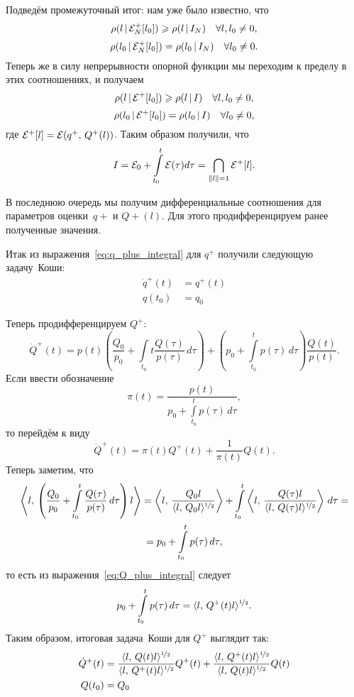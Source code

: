 Подведём промежуточный итог: нам уже было известно, что 
$$
        \rho(l\,|\,\mathcal{E}^+_N[l_0]) \geqslant \rho(l\,|\,I_N)
        \quad
        \forall l, l_0 \neq 0,
$$
$$
        \rho(l_0\,|\,\mathcal{E}^+_N[l_0]) = \rho(l_0\,|\,I_N)
        \quad
        \forall l_0 \neq 0.
$$
Теперь же в силу непрерывности опорной функции мы переходим к пределу в этих соотношениях, и получаем
$$
        \rho(l\,|\,\mathcal{E}^+[l_0]) \geqslant \rho(l\,|\,I)
        \quad
        \forall l, l_0 \neq 0,
$$
$$
        \rho(l_0\,|\,\mathcal{E}^+[l_0]) = \rho(l_0\,|\,I)
        \quad
        \forall l_0 \neq 0,
$$
где $\mathcal{E}^+[l] = \mathcal{E}(q^+,\,Q^+(l))$.
Таким образом получили, что
$$
        I
        =
        \mathcal{E}_0 + \int\limits_{t_0}^t \mathcal{E}(\tau)d\tau
        =
        \bigcap\limits_{\| l \| = 1} \mathcal{E}^+[l].
$$

В последнюю очередь мы получим дифференциальные соотношения для параметров оценки~$q+$ и $Q+(l)$. Для этого продифференцируем ранее полученные значения.

Итак из выражения~\eqref{eq:q_plus_integral} для $q^+$ получили следующую задачу~Коши:
$$
\begin{aligned}
        \dot q^+(t) &= q^+(t) \\
        q(t_0) &= q_0
\end{aligned}
$$

Теперь продифференцируем $Q^+$:
$$
        \dot Q^+(t) = p(t) \left(
\frac{Q_0}{p_0} + \int\limits_{t_0}{t}\frac{Q(\tau)}{p(\tau)}\,d\tau
        \right)
        +
        \left(
p_0 + \int\limits_{t_0}^{t}p(\tau)\,d\tau
        \right)
        \frac{Q(t)}{p(t)}.
$$
Если ввести обозначение
$$
        \pi(t) = \frac{p(t)}{p_0 + \int\limits_{t_0}^{t}p(\tau)\,d\tau},
$$
то перейдём к виду
$$
        \dot Q^+(t) = \pi(t)Q^+(t) + \frac{1}{\pi(t)}Q(t).
$$
Теперь заметим, что
\begin{multline*}
        \left\langle l,\,\left(\frac{Q_0}{p_0} + \int\limits_{t_0}^t\frac{Q(\tau)}{p(\tau)}\,d\tau\right) l \right\rangle
        =
        \left\langle l,\,\frac{Q_0 l}{\langle l,\,Q_0l \rangle^{\nicefrac{1}{2}}}\right\rangle
        +
        \int\limits_{t_0}^t\left\langle l,\,\frac{Q(\tau)l}{\langle l,\,Q(\tau)l\rangle^{\nicefrac{1}{2}}}\right\rangle\,d\tau
        =\\=
        p_0 + \int\limits_{t_0}^{t}p(\tau)\,d\tau,
\end{multline*}
то есть из выражения~\eqref{eq:Q_plus_integral} следует
$$
        p_0 + \int\limits_{t_0}^{t}p(\tau)\,d\tau
        =
        \langle l,\, Q^+(t) l \rangle^{\nicefrac{1}{2}}.
$$
Таким образом, итоговая задача~Коши для $Q^+$ выглядит так:
$$
\begin{aligned}
        \dot Q^+(t) &= \frac{\langle l,\, Q(t) l \rangle^{\nicefrac{1}{2}}}{\langle l,\, Q^+(t) l \rangle^{\nicefrac{1}{2}}}Q^+(t) + \frac{\langle l,\, Q^+(t) l \rangle^{\nicefrac{1}{2}}}{\langle l,\, Q(t) l \rangle^{\nicefrac{1}{2}}}Q(t) \\
        Q(t_0) &= Q_0
\end{aligned}
$$




\clearpage
\begin{thebibliography}{9}

\end{thebibliography}

